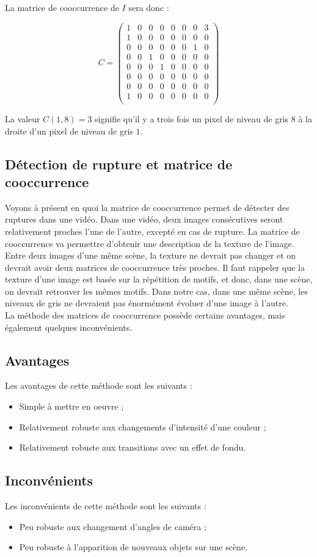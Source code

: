 La matrice de cooccurrence de $I$ sera donc :

\[
 C = \begin{pmatrix}
     1 & 0 & 0 & 0 & 0 & 0 & 0 & 3 \\
     1 & 0 & 0 & 0 & 0 & 0 & 0 & 0 \\
     0 & 0 & 0 & 0 & 0 & 0 & 1 & 0 \\
     0 & 0 & 1 & 0 & 0 & 0 & 0 & 0 \\
     0 & 0 & 0 & 1 & 0 & 0 & 0 & 0 \\
     0 & 0 & 0 & 0 & 0 & 0 & 0 & 0 \\
     0 & 0 & 0 & 0 & 0 & 0 & 0 & 0 \\
     1 & 0 & 0 & 0 & 0 & 0 & 0 & 0 \\   
 \end{pmatrix}
\]

La valeur $C(1, 8) = 3$ signifie qu'il y a trois fois un pixel de niveau de gris $8$ à la droite d'un pixel de niveau de gris $1$.

\subsection{Détection de rupture et matrice de cooccurrence}

Voyons à présent en quoi la matrice de cooccurrence permet de détecter des ruptures dans une vidéo. Dans une vidéo, deux images consécutives seront relativement proches l'une de l'autre, excepté en cas de rupture. La matrice de cooccurrence va permettre d'obtenir une description de la texture de l'image. Entre deux images d'une même scène, la texture ne devrait pas changer et on devrait avoir deux matrices de cooccurrence très proches. Il faut rappeler que la texture d'une image est basée sur la répétition de motifs, et donc, dans une scène, on devrait retrouver les mêmes motifs. Dans notre cas, dans une même scène, les niveaux de gris ne devraient pas énormément évoluer d'une image à l'autre.\\

La méthode des matrices de cooccurrence possède certains avantages, mais également quelques inconvénients.

\subsection{Avantages}

Les avantages de cette méthode sont les suivants :

\begin{itemize}
	\item Simple à mettre en oeuvre ;
	\item Relativement robuste aux changements d'intensité d'une couleur ;
	\item Relativement robuste aux transitions avec un effet de fondu.
\end{itemize}

\subsection{Inconvénients}

Les inconvénients de cette méthode sont les suivants :

\begin{itemize}
	\item Peu robuste aux changement d'angles de caméra ;
	\item Peu robuste à l'apparition de nouveaux objets sur une scène.
\end{itemize}
